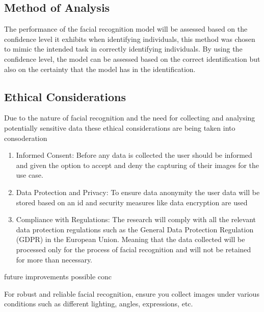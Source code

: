 \documentclass[journal]{IEEEtran}
\begin{document}
\subsection{Method of Analysis}
The performance of the facial recognition model will be assessed based on the confidence level it exhibits when identifying individuals, this method was chosen to mimic the intended task in correctly identifying individuals. By using the confidence level, the model can be assessed based on the correct identification but also on the certainty that the model has in the identification.

\subsection{Ethical Considerations}
Due to the nature of facial recognition and the need for collecting and analysing potentially sensitive data these ethical considerations are being taken into consoderation 

\begin{enumerate}
  \item Informed Consent: Before any data is collected the user should be informed and given the option to accept and deny the capturing of their images for the use case.
  \item Data Protection and Privacy: To ensure data anonymity the user data will be stored based on an id and security measures like data encryption are used 
  \item Compliance with Regulations: The research will comply with all the relevant data protection regulations such as the General Data Protection Regulation (GDPR) in the European Union. Meaning that the data collected will be processed only for the process of facial recognition and will not be retained for more than necessary.
\end{enumerate}



future improvements possible conc

For robust and reliable facial recognition, ensure you collect images under various conditions such as different lighting, angles, expressions, etc.

%
%
\end{document}
